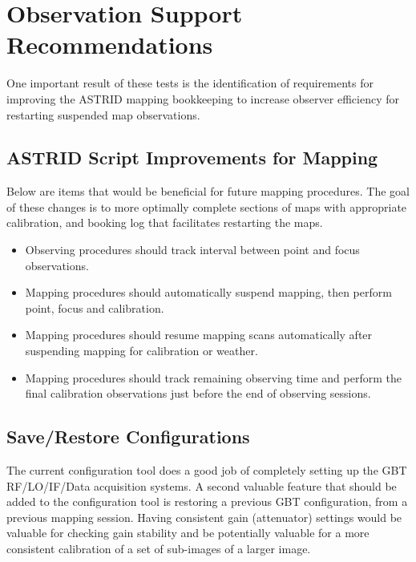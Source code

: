 \documentclass[12pt,twoside]{article}
\begin{document}
\section{Observation Support Recommendations}
One important result of these tests is the identification of requirements for
improving the ASTRID
mapping bookkeeping to increase observer efficiency for restarting 
suspended map observations.  

\subsection{ASTRID Script Improvements for Mapping}
Below are items that would be beneficial for future mapping procedures.
The goal of these changes is to more optimally complete sections of maps with 
appropriate calibration, and booking log that facilitates restarting the maps.

\begin{itemize}
\item Observing procedures should track interval between point and focus observations.
\item Mapping procedures should automatically suspend mapping, then perform point, focus
and calibration.
\item Mapping procedures should resume mapping scans automatically after suspending
mapping for calibration or weather.
\item Mapping procedures should track remaining observing time and perform
the final calibration observations just before the end of observing sessions.
\end{itemize}

\subsection{Save/Restore Configurations}

The current configuration tool does a good job of completely setting up
the GBT RF/LO/IF/Data acquisition systems. 
A second valuable feature that should be added to the configuration tool is restoring
a previous GBT configuration, from a previous mapping session.  Having consistent
gain (attenuator) settings would be valuable for checking gain stability
and be potentially valuable for a more consistent calibration of a set of 
sub-images of a larger image.
\end{document}
